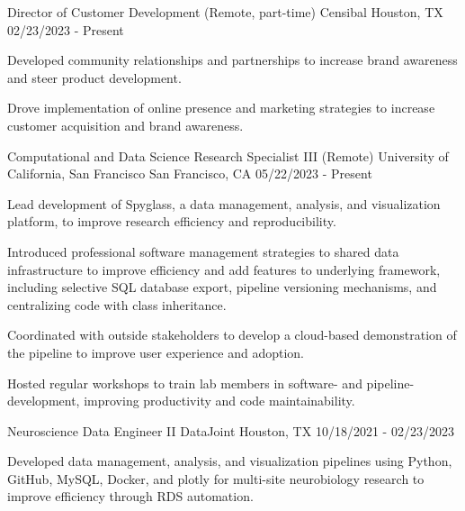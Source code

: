 \begin{cventries}
  \cventry
    {Director of Customer Development (Remote, part-time)}
    {Censibal}
    {Houston, TX}
    {02/23/2023 - Present}
    {
      \begin{cvitems}
        \item { Developed community relationships and partnerships to increase
          brand awareness and steer product development.}
        \item { Drove implementation of online presence and marketing strategies
          to increase customer acquisition and brand awareness.}
      \end{cvitems}
    }
\vspace{\baselineskip}
  \cventry
    {Computational and Data Science Research Specialist III (Remote)}
    {University of California, San Francisco}
    {San Francisco, CA}
    {05/22/2023 - Present}
    {
      \begin{cvitems}
        \item {Lead development of Spyglass, a data management, analysis, and
          visualization platform, to improve research efficiency and reproducibility.}
        \item {Introduced professional software management strategies to shared data
          infrastructure to improve efficiency and add features to underlying
          framework, including selective SQL database export, pipeline
          versioning mechanisms, and centralizing code with class inheritance.}
        \item {Coordinated with outside stakeholders to develop a cloud-based
          demonstration of the pipeline to improve user experience and adoption.}
        \item {Hosted regular workshops to train lab members in software- and
          pipeline-development, improving productivity and code maintainability.}
      \end{cvitems}
    }
\vspace{\baselineskip}
  \cventry
    {Neuroscience Data Engineer II}
    {DataJoint}
    {Houston, TX}
    {10/18/2021 - 02/23/2023}
    {
      \begin{cvitems}
        \item {Developed data management, analysis, and visualization pipelines
          using Python, GitHub, MySQL, Docker, and plotly for multi-site
          neurobiology research to improve efficiency through RDS automation.
}
\end{cvitems}}
\end{cventries}
